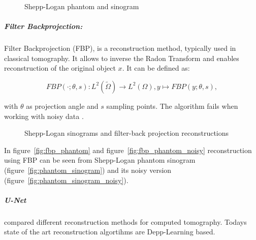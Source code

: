 \begin{figure}[H]
    \label{fig:phantom_and_sinos}
    \hfill
    \hfill
    \hfill
    \hfill
	\caption{Shepp-Logan phantom and sinogram}
\end{figure}

\subparagraph{Filter Backprojection:}
Filter Backprojection \cite{tomographicReconstruction} (FBP), 
is a reconstruction method, typically used in classical tomography.
It allows to inverse the Radon Transform and enables reconstruction of the original object $x$.
It can be defined as:

\begin{equation}
    \label{eq:fbp}
    FBP(\cdot; \theta, s) : L^2(\tilde{\Omega}) \to L^2(\Omega), y \mapsto FBP(y; \theta, s) ,
\end{equation}

with $\theta$ as projection angle and $s$ sampling points. 
The algorithm fails when working with noisy data \cite{cryoEmMath2}.

\begin{figure}[H]
    \label{fig:phantom_fbps}
    \hfill
    \hfill
    \hfill
	\caption{Shepp-Logan sinograms and filter-back projection reconstructions}
\end{figure}

In figure~\ref{fig:fbp_phantom} and figure~\ref{fig:fbp_phantom_noisy} reconstruction using FBP can be seen from 
Shepp-Logan phantom sinogram (figure~\ref{fig:phantom_sinogram}) and its noisy version (figure~\ref{fig:phantom_sinogram_noisy}).

\subparagraph{U-Net}
\citet{ct-reconstruction-comparison} compared different reconstruction methods for computed tomography. 
Todays state of the art reconstruction algortihms are Depp-Learning based.

